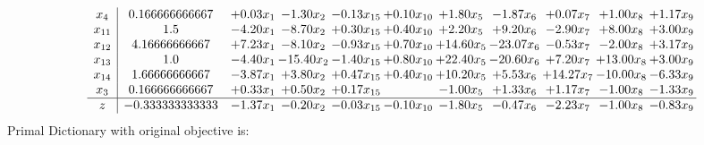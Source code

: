 \documentclass[9pt]{article}
\begin{document}
\[\begin{array}{c| c c@{\hskip 2pt} c@{\hskip 2pt} c@{\hskip 2pt} c@{\hskip 2pt} c@{\hskip 2pt} c@{\hskip 2pt} c@{\hskip 2pt} c@{\hskip 2pt} c@{\hskip 2pt} }
 x_{4}   &  0.166666666667 & +  0.03 x_{1} & -1.30 x_{2} & -0.13 x_{15} & +  0.10 x_{10} & +  1.80 x_{5} & -1.87 x_{6} & +  0.07 x_{7} & +  1.00 x_{8} & +  1.17 x_{9}\\
 x_{11}   &  1.5 & -4.20 x_{1} & -8.70 x_{2} & +  0.30 x_{15} & +  0.40 x_{10} & +  2.20 x_{5} & +  9.20 x_{6} & -2.90 x_{7} & +  8.00 x_{8} & +  3.00 x_{9}\\
 x_{12}   &  4.16666666667 & +  7.23 x_{1} & -8.10 x_{2} & -0.93 x_{15} & +  0.70 x_{10} & + 14.60 x_{5} & -23.07 x_{6} & -0.53 x_{7} & -2.00 x_{8} & +  3.17 x_{9}\\
 x_{13}   &  1.0 & -4.40 x_{1} & -15.40 x_{2} & -1.40 x_{15} & +  0.80 x_{10} & + 22.40 x_{5} & -20.60 x_{6} & +  7.20 x_{7} & + 13.00 x_{8} & +  3.00 x_{9}\\
 x_{14}   &  1.66666666667 & -3.87 x_{1} & +  3.80 x_{2} & +  0.47 x_{15} & +  0.40 x_{10} & + 10.20 x_{5} & +  5.53 x_{6} & + 14.27 x_{7} & -10.00 x_{8} & -6.33 x_{9}\\
 x_{3}   &  0.166666666667 & +  0.33 x_{1} & +  0.50 x_{2} & +  0.17 x_{15} &   & -1.00 x_{5} & +  1.33 x_{6} & +  1.17 x_{7} & -1.00 x_{8} & -1.33 x_{9}\\
\hline
z    &  -0.333333333333 & -1.37 x_{1} & -0.20 x_{2} & -0.03 x_{15} & -0.10 x_{10} & -1.80 x_{5} & -0.47 x_{6} & -2.23 x_{7} & -1.00 x_{8} & -0.83 x_{9}\\
\end{array}\]
Primal Dictionary with original objective is:
\end{document}
